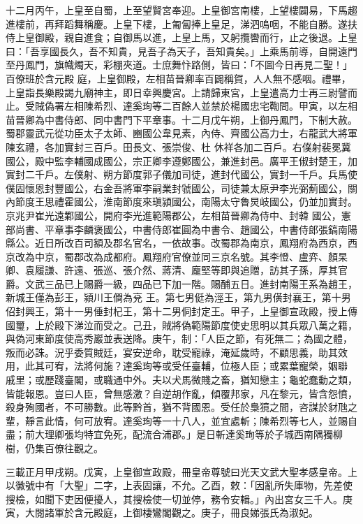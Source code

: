 \begin{pinyinscope}
 十二月丙午，上皇至自蜀，上至望賢宮奉迎。上皇御宮南樓，上望樓闢易，下馬趨進樓前，再拜蹈舞稱慶。上皇下樓，上匍匐捧上皇足，涕泗嗚咽，不能自勝。遂扶侍上皇御殿，親自進食；自御馬以進，上皇上馬，又躬攬轡而行，止之後退。上皇曰：「吾享國長久，吾不知貴，見吾子為天子，吾知貴矣。」上乘馬前導，自開遠門至丹鳳門，旗幟燭天，彩棚夾道。士庶舞忭路側，皆曰：「不圖今日再見二聖！」百僚班於含元殿
 庭，上皇御殿，左相苗晉卿率百闢稱賀，人人無不感咽。禮畢，上皇詣長樂殿謁九廟神主，即日幸興慶宮。上請歸東宮，上皇遣高力士再三尉譬而止。受賊偽署左相陳希烈、達奚珣等二百餘人並禁於楊國忠宅鞫問。甲寅，以左相苗晉卿為中書侍郎、同中書門下平章事。十二月戊午朔，上御丹鳳門，下制大赦。蜀郡靈武元從功臣太子太師、豳國公韋見素，內侍、齊國公高力士，右龍武大將軍陳玄禮，各加實封三百戶。田長文、張崇俊、杜
 休祥各加二百戶。右僕射裴冕冀國公，殿中監李輔國成國公，宗正卿李遵鄭國公，兼進封邑。廣平王俶封楚王，加實封二千戶。左僕射、朔方節度郭子儀加司徒，進封代國公，實封一千戶。兵馬使僕固懷恩封豐國公，右金吾將軍李嗣業封虢國公，司徒兼太原尹李光弼薊國公，關內節度王思禮霍國公，淮南節度來瑱潁國公，南陽太守魯炅岐國公，仍並加實封。京兆尹崔光遠鄴國公，開府李光進範陽郡公，左相苗晉卿為侍中、封韓
 國公，憲部尚書、平章事李麟褒國公，中書侍郎崔圓為中書令、趙國公，中書侍郎張鎬南陽縣公。近日所改百司額及郡名官名，一依故事。改蜀郡為南京，鳳翔府為西京，西京改為中京，蜀郡改為成都府。鳳翔府官僚並同三京名號。其李憕、盧弈、顏杲卿、袁履謙、許遠、張巡、張介然、蔣清、龐堅等即與追贈，訪其子孫，厚其官爵。文武三品已上賜爵一級，四品已下加一階。賜酺五日。進封南陽王系為趙王，新城王僅為彭王，潁川王僴為兗
 王。第七男侹為涇王，第九男僙封襄王，第十男佋封興王，第十一男倕封杞王，第十二男侗封定王。甲子，上皇御宣政殿，授上傳國璽，上於殿下涕泣而受之。己丑，賊將偽範陽節度使史思明以其兵眾八萬之籍，與偽河東節度使高秀巖並表送降。庚午，制：「人臣之節，有死無二；為國之體，叛而必誅。況乎委質賊廷，宴安逆命，耽受寵祿，淹延歲時，不顧思義，助其效用，此其可宥，法將何施？達奚珣等或受任臺輔，位極人臣；或累葉寵榮，姻聯
 戚里；或歷踐臺閣，或職通中外。夫以犬馬微賤之畜，猶知戀主；龜蛇蠢動之類，皆能報恩。豈曰人臣，曾無感激？自逆胡作亂，傾覆邦家，凡在黎元，皆含怨憤，殺身殉國者，不可勝數。此等黔首，猶不背國恩。受任於梟獍之間，咨謀於豺虺之輩，靜言此情，何可放宥。達奚珣等一十八人，並宜處斬；陳希烈等七人，並賜自盡；前大理卿張均特宜免死，配流合浦郡。」是日斬達奚珣等於子城西南隅獨柳樹，仍集百僚往觀之。



 三載正月甲戌朔。戊寅，上皇御宣政殿，冊皇帝尊號曰光天文武大聖孝感皇帝。上以徽號中有「大聖」二字，上表固讓，不允。乙酉，敕：「因亂所失庫物，先差使搜檢，如聞下吏因便擾人，其搜檢使一切並停，務令安輯。」內出宮女三千人。庚寅，大閱諸軍於含元殿庭，上御棲鸞閣觀之。庚子，冊良娣張氏為淑妃。




\end{pinyinscope}
